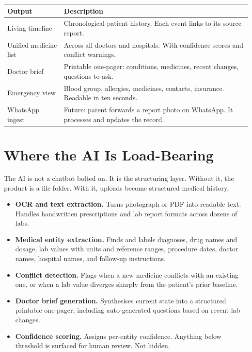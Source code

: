 \documentclass[11pt, a4paper]{article}
\begin{document}
\vspace{4pt}
\begin{tabularx}{\linewidth}{@{}L{3.0cm} X@{}}
\toprule
\textbf{Output} & \textbf{Description} \\
\midrule
Living timeline & Chronological patient history. Each event links to its source report. \\
Unified medicine list & Across all doctors and hospitals. With confidence scores and conflict warnings. \\
Doctor brief & Printable one-pager: conditions, medicines, recent changes, questions to ask. \\
Emergency view & Blood group, allergies, medicines, contacts, insurance. Readable in ten seconds. \\
WhatsApp ingest & Future: parent forwards a report photo on WhatsApp. It processes and updates the record. \\
\bottomrule
\end{tabularx}

\section{Where the AI Is Load-Bearing}

The AI is not a chatbot bolted on. It is the structuring layer. Without it, the product is a file folder. With it, uploads become structured medical history.

\begin{itemize}
  \item \textbf{OCR and text extraction.} Turns photograph or PDF into readable text. Handles handwritten prescriptions and lab report formats across dozens of labs.
  \item \textbf{Medical entity extraction.} Finds and labels diagnoses, drug names and dosage, lab values with units and reference ranges, procedure dates, doctor names, hospital names, and follow-up instructions.
  \item \textbf{Conflict detection.} Flags when a new medicine conflicts with an existing one, or when a lab value diverges sharply from the patient's prior baseline.
  \item \textbf{Doctor brief generation.} Synthesises current state into a structured printable one-pager, including auto-generated questions based on recent lab changes.
  \item \textbf{Confidence scoring.} Assigns per-entity confidence. Anything below threshold is surfaced for human review. Not hidden.
\end{itemize}
\end{document}
